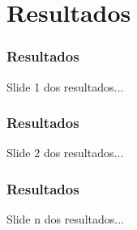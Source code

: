 \section{Resultados}


\begin{frame}

    \frametitle{Resultados}

    Slide 1 dos resultados...

\end{frame}


\begin{frame}

    \frametitle{Resultados}

    Slide 2 dos resultados...

\end{frame}


\begin{frame}

    \frametitle{Resultados}

    Slide n dos resultados...

\end{frame}
